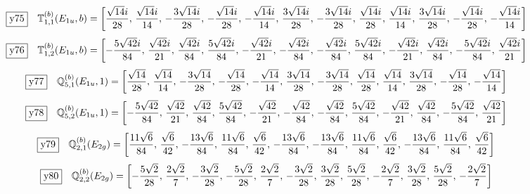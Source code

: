 \documentclass[fleqn,10pt,landscape]{jsarticle}
\begin{document}
\begin{dmath*}
\fbox{y75}\quad \mathbb{T}_{1,1}^{(b)}(E_{1u},b)=\left[ \frac{\sqrt{14} i}{28},\, \frac{\sqrt{14} i}{14},\, - \frac{3 \sqrt{14} i}{28},\, - \frac{\sqrt{14} i}{28},\, - \frac{\sqrt{14} i}{14},\, \frac{3 \sqrt{14} i}{28},\, - \frac{3 \sqrt{14} i}{28},\, \frac{\sqrt{14} i}{28},\, \frac{\sqrt{14} i}{14},\, \frac{3 \sqrt{14} i}{28},\, - \frac{\sqrt{14} i}{28},\, - \frac{\sqrt{14} i}{14} \right]
\end{dmath*}
\begin{dmath*}
\fbox{y76}\quad \mathbb{T}_{1,2}^{(b)}(E_{1u},b)=\left[ - \frac{5 \sqrt{42} i}{84},\, \frac{\sqrt{42} i}{21},\, \frac{\sqrt{42} i}{84},\, \frac{5 \sqrt{42} i}{84},\, - \frac{\sqrt{42} i}{21},\, - \frac{\sqrt{42} i}{84},\, - \frac{\sqrt{42} i}{84},\, \frac{5 \sqrt{42} i}{84},\, - \frac{\sqrt{42} i}{21},\, \frac{\sqrt{42} i}{84},\, - \frac{5 \sqrt{42} i}{84},\, \frac{\sqrt{42} i}{21} \right]
\end{dmath*}
\begin{dmath*}
\fbox{y77}\quad \mathbb{Q}_{5,1}^{(b)}(E_{1u},1)=\left[ \frac{\sqrt{14}}{28},\, \frac{\sqrt{14}}{14},\, - \frac{3 \sqrt{14}}{28},\, - \frac{\sqrt{14}}{28},\, - \frac{\sqrt{14}}{14},\, \frac{3 \sqrt{14}}{28},\, - \frac{3 \sqrt{14}}{28},\, \frac{\sqrt{14}}{28},\, \frac{\sqrt{14}}{14},\, \frac{3 \sqrt{14}}{28},\, - \frac{\sqrt{14}}{28},\, - \frac{\sqrt{14}}{14} \right]
\end{dmath*}
\begin{dmath*}
\fbox{y78}\quad \mathbb{Q}_{5,2}^{(b)}(E_{1u},1)=\left[ - \frac{5 \sqrt{42}}{84},\, \frac{\sqrt{42}}{21},\, \frac{\sqrt{42}}{84},\, \frac{5 \sqrt{42}}{84},\, - \frac{\sqrt{42}}{21},\, - \frac{\sqrt{42}}{84},\, - \frac{\sqrt{42}}{84},\, \frac{5 \sqrt{42}}{84},\, - \frac{\sqrt{42}}{21},\, \frac{\sqrt{42}}{84},\, - \frac{5 \sqrt{42}}{84},\, \frac{\sqrt{42}}{21} \right]
\end{dmath*}
\begin{dmath*}
\fbox{y79}\quad \mathbb{Q}_{2,1}^{(b)}(E_{2g})=\left[ \frac{11 \sqrt{6}}{84},\, \frac{\sqrt{6}}{42},\, - \frac{13 \sqrt{6}}{84},\, \frac{11 \sqrt{6}}{84},\, \frac{\sqrt{6}}{42},\, - \frac{13 \sqrt{6}}{84},\, - \frac{13 \sqrt{6}}{84},\, \frac{11 \sqrt{6}}{84},\, \frac{\sqrt{6}}{42},\, - \frac{13 \sqrt{6}}{84},\, \frac{11 \sqrt{6}}{84},\, \frac{\sqrt{6}}{42} \right]
\end{dmath*}
\begin{dmath*}
\fbox{y80}\quad \mathbb{Q}_{2,2}^{(b)}(E_{2g})=\left[ - \frac{5 \sqrt{2}}{28},\, \frac{2 \sqrt{2}}{7},\, - \frac{3 \sqrt{2}}{28},\, - \frac{5 \sqrt{2}}{28},\, \frac{2 \sqrt{2}}{7},\, - \frac{3 \sqrt{2}}{28},\, \frac{3 \sqrt{2}}{28},\, \frac{5 \sqrt{2}}{28},\, - \frac{2 \sqrt{2}}{7},\, \frac{3 \sqrt{2}}{28},\, \frac{5 \sqrt{2}}{28},\, - \frac{2 \sqrt{2}}{7} \right]
\end{dmath*}
\end{document}
